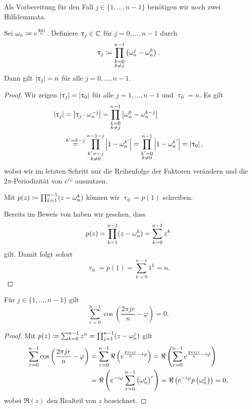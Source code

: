 \noindent Als Vorbereitung für den Fall $j \in \{1, \dots, n-1\}$ benötigen wir noch zwei
Hilfslemmata.
\begin{lemma}
    \label{lemma:uptau_j}
    Sei $\omega_n \coloneqq e^{\frac{2 \pi i}{n}}$.
    Definiere $\uptau_j \in \mathbb{C}$ für $j=0, \dots, n-1$ durch
    \[
        \uptau_j \coloneqq \prod_{\substack{k=0\\k\neq j}}^{n-1} \left( \omega_n^j - \omega_n^k\right).
    \]
    Dann gilt $\left\lvert \uptau_j \right\rvert = n$ für alle $j = 0, \dots, n-1$.
\end{lemma}
\begin{proof}
    Wir zeigen $\left\lvert \uptau_j \right\rvert = \left\lvert \uptau_0 \right\rvert$ für alle $j = 1, \dots, n-1$ und
    $\uptau_0 = n$.
    Es gilt
    \[
        \begin{split}
            \left\lvert \uptau_j \right\rvert
            &= \left\lvert \uptau_j \cdot \omega_n^{-j} \right\rvert
            = \prod_{\substack{k=0\\ k\neq j}}^{n-1} \left\lvert \omega_n^0 - \omega_n^{k-j}  \right\rvert\\
            &\overset{k' = k-j}{=}
            \prod_{\substack{k'=-j\\ k\neq 0}}^{n-1-j} \left\lvert 1 - \omega_n^{k'} \right\rvert
            = \prod_{\substack{k'=0\\ k\neq 0}}^{n-1} \left\lvert 1 - \omega_n^{k'} \right\rvert
            = \left\lvert \uptau_0 \right\rvert,
        \end{split}
    \]
    wobei wir im letzten Schritt nur die Reihenfolge der Faktoren verändern und
    die $2\pi$-Periodizität von $e^{i \varphi}$ ausnutzen.

    \noindent Mit $p(z) \coloneqq \prod_{k=1}^{n-1} (z - \omega_n^k)$ können wir $\uptau_0 = p(1)$
    schreiben.

    Bereits im Beweis von  haben wir gesehen, dass
    \[
        p(z) = \prod_{k=1}^{n-1} (z-\omega_n^k) = \sum_{k=0}^{n-1} z^k
    \]
    gilt.
    Damit folgt sofort
    \[
        \uptau_0 = p(1) = \sum_{k=0}^{n-1} 1^k = n.
    \]
\end{proof}

\begin{lemma}
    \label{lemma:sum_shifted_unit_roots}
    Für $j \in \{1, \dots, n-1\}$ gilt
    \[
        \sum_{r=0}^{n-1} \cos \left( \frac{2 \pi j r}{n} - \varphi \right) = 0.
    \]
\end{lemma}
\begin{proof}
    Mit $p(z) \coloneqq \sum_{k=0}^{n-1} z^n = \prod_{j=1}^{n-1} (z - \omega_n^j)$ gilt
    \[
        \begin{split}
            \sum_{r=0}^{n-1} \cos \left( \frac{2 \pi j r}{n} - \varphi \right)
            &= \sum_{r=0}^{n-1} \Re\left( e^{\frac{2 \pi i j r}{n} - i \varphi} \right)
            = \Re \left( \sum_{r=0}^{n-1} e^{\frac{2 \pi i j r}{n} - i \varphi} \right)\\
            &= \Re \left( e^{-i \varphi}\sum_{r=0}^{n-1} \left( \omega_n^j \right)^r \right)
            = \Re \left( e^{-i \varphi} p\left( \omega_n^j \right) \right)
            = 0,
        \end{split}
    \]
    wobei $\Re(z)$ den Realteil von $z$ bezeichnet.
\end{proof}

